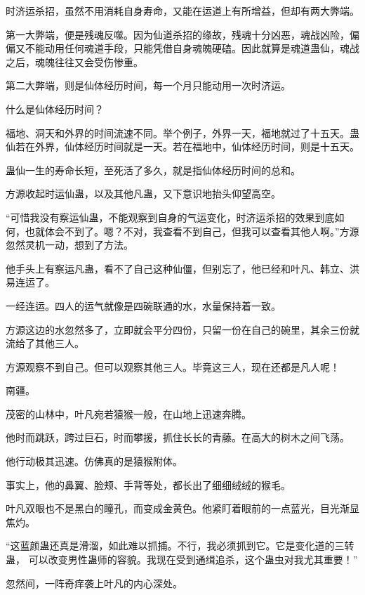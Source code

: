 
\begin{this_body}



时济运杀招，虽然不用消耗自身寿命，又能在运道上有所增益，但却有两大弊端。

第一大弊端，便是残魂反噬。因为仙道杀招的缘故，残魂十分凶恶，魂战凶险，偏偏又不能动用任何魂道手段，只能凭借自身魂魄硬磕。因此就算是魂道蛊仙，魂战之后，魂魄往往又会受伤惨重。

第二大弊端，则是仙体经历时间，每一个月只能动用一次时济运。

什么是仙体经历时间？

福地、洞天和外界的时间流速不同。举个例子，外界一天，福地就过了十五天。蛊仙若在外界，仙体经历时间就是一天。若在福地中，仙体经历时间，则是十五天。

蛊仙一生的寿命长短，至死活了多久，就是指仙体经历时间的总和。

方源收起时运仙蛊，以及其他凡蛊，又下意识地抬头仰望高空。

“可惜我没有察运仙蛊，不能观察到自身的气运变化，时济运杀招的效果到底如何，也就体会不到了。嗯？不对，我查看不到自己，但我可以查看其他人啊。”方源忽然灵机一动，想到了方法。

他手头上有察运凡蛊，看不了自己这种仙僵，但别忘了，他已经和叶凡、韩立、洪易连运了。

一经连运。四人的运气就像是四碗联通的水，水量保持着一致。

方源这边的水忽然多了，立即就会平分四份，只留一份在自己的碗里，其余三份就流给了其他三人。

方源观察不到自己。但可以观察其他三人。毕竟这三人，现在还都是凡人呢！

南疆。

茂密的山林中，叶凡宛若猿猴一般，在山地上迅速奔腾。

他时而跳跃，跨过巨石，时而攀援，抓住长长的青藤。在高大的树木之间飞荡。

他行动极其迅速。仿佛真的是猿猴附体。

事实上，他的鼻翼、脸颊、手背等处，都长出了细细绒绒的猴毛。

叶凡双眼也不是黑白的瞳孔，而变成金黄色。他紧盯着眼前的一点蓝光，目光渐显焦灼。

“这蓝颜蛊还真是滑溜，如此难以抓捕。不行，我必须抓到它。它是变化道的三转蛊， 可以改变男性蛊师的容貌。我现在受到通缉追杀，这个蛊虫对我尤其重要！”

忽然间，一阵奇痒袭上叶凡的内心深处。


\end{this_body}
